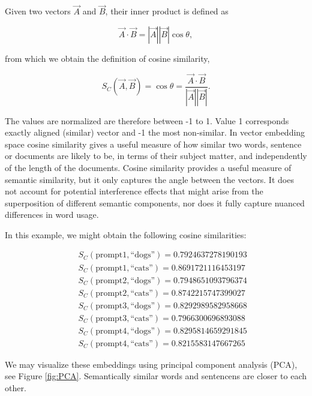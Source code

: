 \documentclass[prd,amsmath,amssymb,12pt]{revtex4}
\begin{document}
Given two vectors $\vec{A}$ and $\vec{B}$, their inner product is defined as

\begin{equation}
   \vec{A}\cdot \vec{B} =  |\vec{A}||\vec{B}|\cos\theta,
\end{equation}

\noindent
from which we obtain the definition of cosine similarity,

\begin{equation}
    S_C(\vec{A},\vec{B})= \cos\theta = \frac{\vec{A}\cdot \vec{B}}{|\vec{A}||\vec{B}|}.
\end{equation}

\noindent
The values are normalized are therefore between -1 to 1. Value 1 corresponds exactly aligned (similar) vector
and -1 the most non-similar.
In vector embedding space cosine similarity gives a useful measure of how similar two words, sentence or
documents are likely to be,
in terms of their subject matter, and independently of the length of the documents.
Cosine similarity provides a useful measure of semantic similarity, but it only captures the angle between the vectors.
It does not account for potential interference effects that might arise from the superposition of different
semantic components, nor does it fully capture nuanced differences in word usage.

In this example, we might obtain the following cosine similarities:

\begin{eqnarray}
    &&S_C(\text{prompt1},\text{``dogs''}) =  0.7924637278190193 \\
    &&S_C(\text{prompt1},\text{``cats''}) =  0.8691721116453197 \\
    &&S_C(\text{prompt2},\text{``dogs''}) =  0.7948651093796374 \\
    &&S_C(\text{prompt2},\text{``cats''}) =  0.8742215747399027 \\
    &&S_C(\text{prompt3},\text{``dogs''}) =  0.8292989582958668 \\
    &&S_C(\text{prompt3},\text{``cats''}) =  0.7966300696893088\\
    &&S_C(\text{prompt4},\text{``dogs''}) =  0.8295814659291845 \\
    &&S_C(\text{prompt4},\text{``cats''}) =  0.8215583147667265
\end{eqnarray}

\noindent
We may visualize these embeddings using principal component analysis (PCA), see Figure \ref{fig:PCA}. Semantically
similar words and sentencens are closer to each other.
\end{document}
